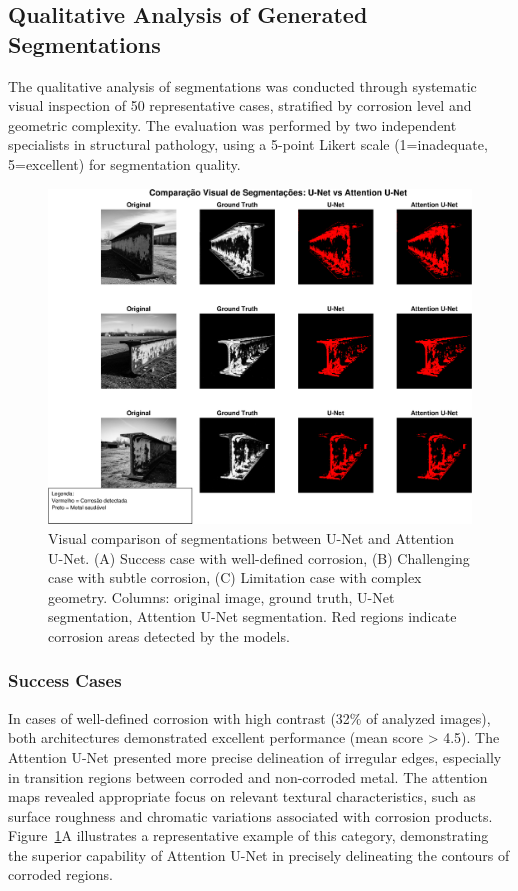 \documentclass[12pt,a4paper,twoside]{article}
\begin{document}
\subsection{Qualitative Analysis of Generated Segmentations}
\label{subsec:qualitative_analysis}

The qualitative analysis of segmentations was conducted through systematic visual inspection of 50 representative cases, stratified by corrosion level and geometric complexity. The evaluation was performed by two independent specialists in structural pathology, using a 5-point Likert scale (1=inadequate, 5=excellent) for segmentation quality.

\begin{figure}[H]
    \centering
    \includegraphics[width=\textwidth]{figura_comparacao_segmentacoes}
    \caption{Visual comparison of segmentations between U-Net and Attention U-Net. (A) Success case with well-defined corrosion, (B) Challenging case with subtle corrosion, (C) Limitation case with complex geometry. Columns: original image, ground truth, U-Net segmentation, Attention U-Net segmentation. Red regions indicate corrosion areas detected by the models.}
    \label{fig:segmentation_comparison}
\end{figure}

\subsubsection{Success Cases}

In cases of well-defined corrosion with high contrast (32\% of analyzed images), both architectures demonstrated excellent performance (mean score > 4.5). The Attention U-Net presented more precise delineation of irregular edges, especially in transition regions between corroded and non-corroded metal. The attention maps revealed appropriate focus on relevant textural characteristics, such as surface roughness and chromatic variations associated with corrosion products. Figure~\ref{fig:segmentation_comparison}A illustrates a representative example of this category, demonstrating the superior capability of Attention U-Net in precisely delineating the contours of corroded regions.
\end{document}
